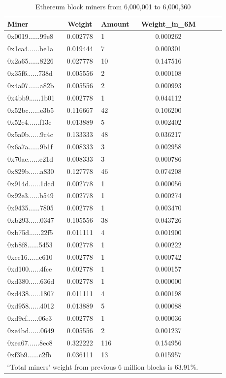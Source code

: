 \documentclass[conference]{IEEEtran}
\begin{document}
\begin{table}[htbp]
\caption{Ethereum block miners from 6,000,001 to 6,000,360}
\begin{center}
\begin{tabular}{lclclcl}
\hline
Miner                                      & Weight   & Amount & Weight\_in\_6M \\
\hline
0x0019......99e8 & 0.002778 & 1      & 0.000262   \\
0x1ca4......be1a & 0.019444 & 7      & 0.000301   \\
0x2a65......8226 & 0.027778 & 10     & 0.147516   \\
0x35f6......738d & 0.005556 & 2      & 0.000108   \\
0x4a07......a82b & 0.005556 & 2      & 0.000993   \\
0x4bb9......1b01 & 0.002778 & 1      & 0.044112   \\
0x52bc......e3b5 & 0.116667 & 42     & 0.106200   \\
0x52e4......f13c & 0.013889 & 5      & 0.002402   \\
0x5a0b......9c4c & 0.133333 & 48     & 0.036217   \\
0x6a7a......9b1f & 0.008333 & 3      & 0.002958   \\
0x70ae......e21d & 0.008333 & 3      & 0.000786   \\
0x829b......a830 & 0.127778 & 46     & 0.074208   \\
0x914d......1dcd & 0.002778 & 1      & 0.000056   \\
0x92e3......b549 & 0.002778 & 1      & 0.000274   \\
0x9435......7805 & 0.002778 & 1      & 0.003470   \\
0xb293......0347 & 0.105556 & 38     & 0.043726   \\
0xb75d......22f5 & 0.011111 & 4      & 0.001900   \\
0xb8f8......5453 & 0.002778 & 1      & 0.000222   \\
0xcc16......e610 & 0.002778 & 1      & 0.000742   \\
0xd100......4fce & 0.002778 & 1      & 0.000157   \\
0xd380......636d & 0.002778 & 1      & 0.000000   \\
0xd438......1807 & 0.011111 & 4      & 0.000198   \\
0xd958......4012 & 0.013889 & 5      & 0.000088   \\
0xd9cf......06e3 & 0.002778 & 1      & 0.000036   \\
0xe4bd......0649 & 0.005556 & 2      & 0.001237   \\
0xea67......8ec8 & 0.322222 & 116    & 0.154956   \\
0xf3b9......c2fb & 0.036111 & 13     & 0.015957  \\
\hline
\multicolumn{4}{l}{$^{\mathrm{a}}$Total miners' weight from previous 6 million blocks is 63.91\%.}
\end{tabular}
\end{center}
\end{table}
\end{document}
